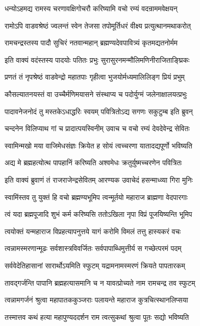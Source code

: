 \twolineshloka
{धन्योऽहमद्य रामस्य चरणावक्षिगोचरौ}
{करिष्यामि वचो रम्यं वदन्राममवेक्षयन्}%

\twolineshloka
{रामोऽपि वाडवश्रेष्ठं ज्वलन्तं स्वेन तेजसा}
{तपोमूर्तिधरं वीक्ष्य प्रत्युत्थानमथाकरोत्}%

\twolineshloka
{रामचन्द्रस्तस्य पादौ सुचिरं नतवान्महान्}
{ब्रह्मण्यदेवपावित्र्यं कृतमद्यतनोर्मम}%

\twolineshloka
{इति वाक्यं वदंस्तस्य पादयोः पतितः प्रभुः}
{सुरासुरनमन्मौलिमणिनीराजिताङ्घ्रिकः}%

\twolineshloka
{प्रणतं तं नृपश्रेष्ठं वाडवेन्द्रो महातपाः}
{गृहीत्वा भुजयोर्मध्यमालिलिङ्ग प्रियं प्रभुम्}%

\twolineshloka
{कौसल्यातनयस्तं वा उच्चैर्मणिमयासने}
{संस्थाप्य च पदोर्युग्मं जलेनाक्षालयत्प्रभुः}%

\twolineshloka
{पादावनेजनोदं तु मस्तकेऽधाद्धरिः स्वयम्}
{पवित्रितोऽद्य सगणः सकुटुम्ब इति ब्रुवन्}%

\twolineshloka
{चन्दनेन विलिप्याथ गां च प्रादात्पयस्विनीम्}
{उवाच च वचो रम्यं देवदेवेन्द्र सेवितः}%

\twolineshloka
{स्वामिन्मखो मया वाजिमेधसंज्ञः क्रियेत ह}
{सोयं त्वच्चरणा यातादद्यपूर्णो भविष्यति}%

\twolineshloka
{अद्य मे ब्रह्महत्योत्थ पापहानिं करिष्यति}
{अश्वमेधः क्रतुर्युष्मच्चरणेन पवित्रितः}%

\twolineshloka
{इति वाक्यं ब्रुवाणं तं राजराजेन्द्रसेवितम्}
{आरण्यक उवाचेदं हसन्माध्व्या गिरा मुनिः}%

\twolineshloka
{स्वामिंस्तव तु युक्तं हि वचो ब्रह्मण्यभूमिप}
{त्वन्मूर्तयो महाराज ब्राह्मणा वेदपारगाः}%

\twolineshloka
{त्वं यदा ब्रह्मपूजादि शुभं कर्म करिष्यसि}
{ततोऽखिला नृपा विप्रं पूजयिष्यन्ति भूमिप}%

\twolineshloka
{त्वयोक्तं यन्महाराज विप्रहत्यापनुत्तये}
{यागं करोमि विमलं तत्तु हास्यकरं वचः}%

\twolineshloka
{त्वन्नामस्मरणान्मूढः सर्वशास्त्रविवर्जितः}
{सर्वपापाब्धिमुत्तीर्य स गच्छेत्परमं पदम्}%

\twolineshloka
{सर्ववेदेतिहासानां सारार्थोऽयमिति स्फुटम्}
{यद्रामनामस्मरणं क्रियते पापतारकम्}%

\twolineshloka
{तावद्गर्जन्ति पापानि ब्रह्महत्यासमानि च}
{न यावत्प्रोच्यते नाम रामचन्द्र तव स्फुटम्}%

\twolineshloka
{त्वन्नामगर्जनं श्रुत्वा महापातककुञ्जराः}
{पलायन्ते महाराज कुत्रचित्स्थानलिप्सया}%

\twolineshloka
{तस्मात्तव कथं हत्या महापुण्यददर्शन}
{राम त्वत्सुकथां श्रुत्वा पूतः सद्यो भविष्यति}%

